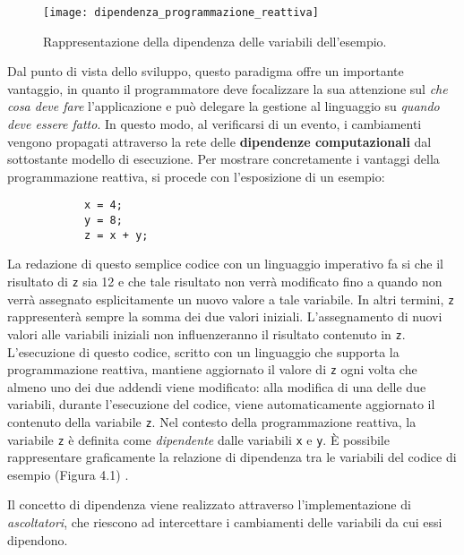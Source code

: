 \begin{figure}
	\begin{center}
		\texttt{[image: dipendenza\_programmazione\_reattiva]}
		\caption[Programmazione reattiva]{Rappresentazione della dipendenza delle variabili dell'esempio.}
		\label{figura:dipendenza_programmazione_reattiva}
	\end{center}
\end{figure}

Dal punto di vista dello sviluppo, questo paradigma offre un importante vantaggio, in quanto il programmatore deve focalizzare la sua attenzione sul \textit{che cosa deve fare} l'applicazione e può delegare la gestione al linguaggio su \textit{quando deve essere fatto}. In questo modo, al verificarsi di un evento, i cambiamenti vengono propagati attraverso la rete delle \textbf{dipendenze computazionali} dal sottostante modello di esecuzione. Per mostrare concretamente i vantaggi della programmazione reattiva, si procede con l'esposizione di un esempio:
\begin{center}
	\begin{lstlisting}
			x = 4;
			y = 8;
			z = x + y;
	\end{lstlisting}
\end{center}
La redazione di questo semplice codice con un linguaggio imperativo fa si che il risultato di \verb|z| sia 12 e che tale risultato non verrà modificato fino a quando non verrà assegnato esplicitamente un nuovo valore a tale variabile. In altri termini, \verb|z| rappresenterà sempre la somma dei due valori iniziali. L'assegnamento di nuovi valori alle variabili iniziali non influenzeranno il risultato contenuto in \verb|z|. L'esecuzione di questo codice, scritto con un linguaggio che supporta la programmazione reattiva, mantiene aggiornato il valore di \verb|z| ogni volta che almeno uno dei due addendi viene modificato: alla modifica di una delle due variabili, durante l'esecuzione del codice, viene automaticamente aggiornato il contenuto della variabile \verb|z|. Nel contesto della programmazione reattiva, la variabile \verb|z| è definita come \textit{dipendente} dalle variabili \verb|x| e \verb|y|. È possibile rappresentare graficamente la relazione di dipendenza tra le variabili del codice di esempio (Figura 4.1) \cite{reactive_programming_wikipedia}.

Il concetto di dipendenza viene realizzato attraverso l'implementazione di \textit{ascoltatori}, che riescono ad intercettare i cambiamenti delle variabili da cui essi dipendono.


